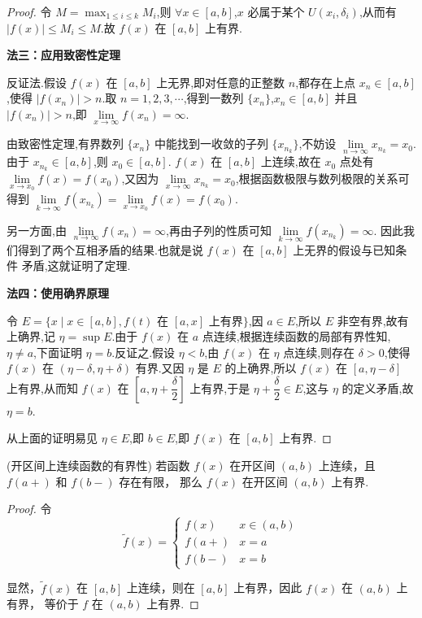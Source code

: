 \begin{proof}
	令 $M = \max_{1 \leqslant i \leqslant k} M_i$,则 $\forall x \in [a, b]$,$x$ 必属于某个 $U(x_i, \delta_i)$,从而有 $|f(x)| \leqslant M_i \leqslant M$.故 $f(x)$ 在 $[a, b]$ 上有界.
	
	\textbf{法三：应用致密性定理}
	
	反证法.假设 $f(x)$ 在 $[a, b]$ 上无界,即对任意的正整数 $n$,都存在上点 $x_n \in [a, b]$,使得 $|f(x_n)| > n$.取 $n = 1, 2, 3, \cdots$,得到一数列 $\{x_n\}$,$x_n \in [a, b]$ 并且 $|f(x_n)| > n$,即 $\lim\limits_{x \to \infty} f(x_n) = \infty$.
	
	由致密性定理,有界数列 $\{x_n\}$ 中能找到一收敛的子列 $\{x_{n_k}\}$,不妨设 $\lim\limits_{n \to \infty} x_{n_k} = x_0$.由于 $x_{n_k} \in [a, b]$,则 $x_0 \in [a, b]$. $f(x)$ 在 $[a, b]$ 上连续,故在 $x_0$ 点处有 $\lim\limits_{x \to x_0} f(x) = f(x_0)$,又因为 $\lim\limits_{x \to \infty} x_{n_k} = x_0$,根据函数极限与数列极限的关系可得到 $\lim\limits_{k \to \infty} f(x_{n_k}) = \lim\limits_{x \to x_0} f(x) = f(x_0)$.
	
	另一方面,由 $\lim\limits_{n \to \infty} f(x_n) = \infty$,再由子列的性质可知 $\lim\limits_{ k \to \infty } f(x_{n_k})  = \infty$. 因此我们得到了两个互相矛盾的结果.也就是说 $f(x)$ 在 $[a, b]$ 上无界的假设与已知条件 矛盾,这就证明了定理.
	
	\textbf{法四：使用确界原理}
	
	令 $E = \{x \mid x \in [a, b], f(t) \text{ 在 } [a, x] \text{ 上有界}\}$,因 $a \in E$,所以 $E$ 非空有界,故有上确界,记 $\eta = \sup E$.由于 $f(x)$ 在 $a$ 点连续,根据连续函数的局部有界性知,$\eta \neq a$,下面证明 $\eta = b$.反证之.假设 $\eta < b$,由 $f(x)$ 在 $\eta$ 点连续,则存在 $\delta > 0$,使得 $f(x)$ 在 $(\eta - \delta, \eta + \delta)$ 有界.又因 $\eta$ 是 $E$ 的上确界,所以 $f(x)$ 在 $[a, \eta - \delta]$ 上有界,从而知 $f(x)$ 在 $\left[a, \eta + \dfrac{\delta}{2}\right]$ 上有界,于是 $\eta + \dfrac{\delta}{2} \in E$,这与 $\eta$ 的定义矛盾,故 $\eta = b$.
	
	从上面的证明易见 $\eta \in E$,即 $b \in E$,即 $f(x)$ 在 $[a, b]$ 上有界.
\end{proof}
\begin{corollary}(开区间上连续函数的有界性)
	若函数 \( f(x) \) 在开区间 \((a, b)\) 上连续，且 \( f(a+) \) 和 \( f(b-) \) 存在有限，
	那么 \( f(x) \) 在开区间 \((a, b)\) 上有界.
	\label{limconfunopem}
\end{corollary}
\begin{proof}
	令
	\[
	\widetilde{f}(x) = \begin{cases}
		f(x) & x \in (a, b) \\
		f(a+) & x = a \\
		f(b-) & x = b
	\end{cases}
	\]
	
	显然，\(\widetilde{f}(x)\) 在 \([a, b]\) 上连续，则在 \([a, b]\) 上有界，因此 \( f(x) \) 在 \((a, b)\) 上有界，
	等价于 \( f \) 在 \((a, b)\)  上有界.
\end{proof}
